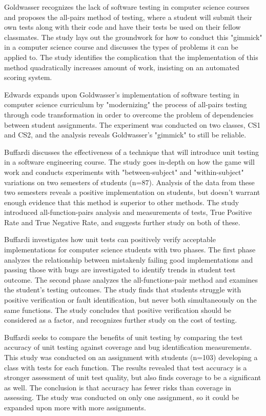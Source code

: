 \documentclass[10pt,sigconf]{acmart}
\begin{document}
Goldwasser \cite{goldwasser-2002} recognizes the lack of software testing in computer science courses and
proposes the all-pairs method of testing, where a student will submit their own tests along with
their code and have their tests be used on their fellow classmates. The study lays out the groundwork
for how to conduct this "gimmick" in a computer science course and discusses the types of problems it can
be applied to. The study identifies the complication that the implementation of this method quadratically
increases amount of work, insisting on an automated scoring system.

Edwards \cite{edwards-2012} expands upon Goldwasser's implementation of software testing in computer
science curriculum by "modernizing" the process of all-pairs testing through code transformation
in order to overcome the problem of dependencies between student assignments. The experiment was
conducted on two classes, CS1 and CS2, and the analysis reveals Goldwasser's "gimmick" to still be
reliable. 

Buffardi \cite{buffardi-2018} discusses the effectiveness of a technique that will introduce unit testing in a
software engineering course. The study goes in-depth on how the game will work and conducts experiments with "between-subject" and "within-subject" variations on two semesters of students (n=87). Analysis of the data from these two semesters reveals a positive implementation on students, but doesn't warrant enough evidence that this method is superior to other methods. The study introduced all-function-pairs analysis and measurements of tests, True Positive Rate and True Negative Rate, and suggests further study on both of these. 

Buffardi \cite{buffardi-jan2019} investigates how unit tests can positively verify acceptable implementations for computer science students with two phases. The first phase analyzes the relationship between mistakenly failing good implementations and passing those with bugs are investigated to identify trends in student test outcome. The second phase analyzes the all-functions-pair method and examines the student's testing outcomes. The study finds that students struggle with positive verification or fault identification, but never both simultaneously on the same functions. The study concludes that positive verification should be considered as a factor, and recognizes further study on the cost of testing.

Buffardi \cite{buffardi-feb2019} seeks to compare the benefits of unit testing by comparing the test accuracy of unit testing against coverage and bug identification measurements. This study was conducted on an assignment with students (n=103) developing a class with tests for each function. The results revealed that test accuracy is a stronger assessment of unit test quality, but also finds coverage to be a significant as well. The conclusion is that accuracy has fewer risks than coverage in assessing. The study was conducted on only one assignment, so it could be expanded upon more with more assignments.
\end{document}
